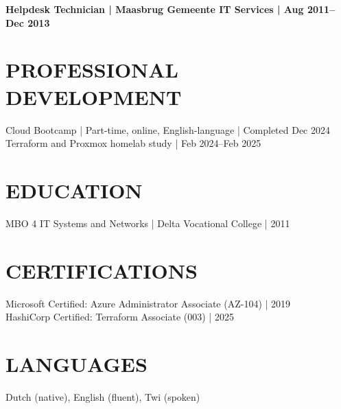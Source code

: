 \documentclass[11pt,a4paper]{article}
\begin{document}
\noindent\textbf{Helpdesk Technician | Maasbrug Gemeente IT Services | Aug 2011--Dec 2013}

\section*{PROFESSIONAL DEVELOPMENT}
Cloud Bootcamp | Part-time, online, English-language | Completed Dec 2024\\
Terraform and Proxmox homelab study | Feb 2024--Feb 2025

\section*{EDUCATION}
MBO 4 IT Systems and Networks | Delta Vocational College | 2011

\section*{CERTIFICATIONS}
Microsoft Certified: Azure Administrator Associate (AZ-104) | 2019\\
HashiCorp Certified: Terraform Associate (003) | 2025

\section*{LANGUAGES}
Dutch (native), English (fluent), Twi (spoken)
\end{document}
